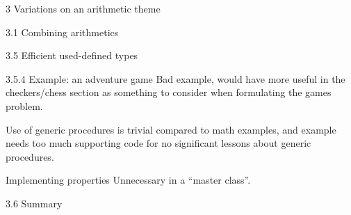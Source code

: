 \documentclass[12pt]{PalisadesLakesBook}
\begin{document}
\begin{plSection}{3 Variations on an arithmetic theme}
\begin{plSection}{3.1 Combining arithmetics}
\begin{plSection}{3.5 Efficient used-defined types}
\begin{plSection}{3.5.4 Example: an adventure game}
Bad example, would have more useful in the checkers/chess
section as something to consider when formulating the 
games problem.

Use of generic procedures is trivial compared
to math examples, and example needs too much supporting code
for no significant lessons about generic procedures.
 
\begin{plSection}{Implementing properties}
Unnecessary in a ``master class''.
\end{plSection}%
\end{plSection}%
\end{plSection}%
\begin{plSection}{3.6 Summary}
\end{plSection}%
\end{plSection}%
\end{plSection}%
\BeginAppendices

\end{document}
